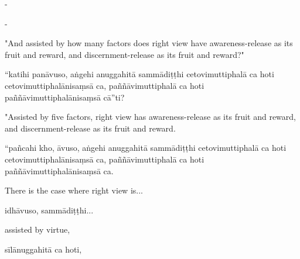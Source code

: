 \begin{samepage}
\begin{leftcolumn*}
-
\end{leftcolumn*}

\begin{rightcolumn}
-
\end{rightcolumn}
\end{samepage}

\begin{samepage}
\begin{leftcolumn*}
"And assisted by how many factors does right view have awareness-release as its fruit and reward, and discernment-release as its fruit and reward?"
\end{leftcolumn*}

\begin{rightcolumn}
“katihi panāvuso, aṅgehi anuggahitā sammādiṭṭhi cetovimuttiphalā ca hoti cetovimuttiphalānisaṃsā ca, paññāvimuttiphalā ca hoti paññāvimuttiphalānisaṃsā cā”ti?
\end{rightcolumn}
\end{samepage}

\begin{samepage}
\begin{leftcolumn*}
"Assisted by five factors, right view has awareness-release as its fruit and reward, and discernment-release as its fruit and reward.
\end{leftcolumn*}

\begin{rightcolumn}
“pañcahi kho, āvuso, aṅgehi anuggahitā sammādiṭṭhi cetovimuttiphalā ca hoti cetovimuttiphalānisaṃsā ca, paññāvimuttiphalā ca hoti paññāvimuttiphalānisaṃsā ca.
\end{rightcolumn}
\end{samepage}

\begin{samepage}
\begin{leftcolumn*}
There is the case where right view is...
\end{leftcolumn*}

\begin{rightcolumn}
idhāvuso, sammādiṭṭhi...
\end{rightcolumn}
\end{samepage}

\begin{samepage}
\begin{leftcolumn*}
assisted by virtue,
\end{leftcolumn*}

\begin{rightcolumn}
sīlānuggahitā ca hoti,
\end{rightcolumn}
\end{samepage}

